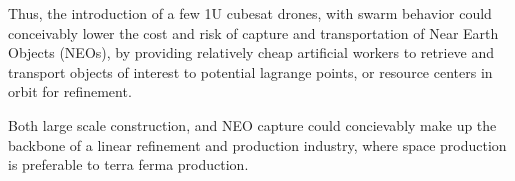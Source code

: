 Thus, the introduction of a few 1U cubesat drones, with swarm behavior could conceivably lower the cost and risk of capture and transportation of Near Earth Objects (NEOs), by providing relatively cheap artificial workers to retrieve and transport objects of interest to potential lagrange points, or resource centers in orbit for refinement.

Both large scale construction, and NEO capture could concievably make up the backbone of a linear refinement and production industry, where space production is preferable to terra ferma production.



